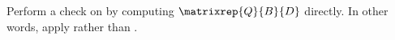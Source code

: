 Perform a check on  by computing $\matrixrep{Q}{B}{D}$ directly.  In other words, apply  rather than .